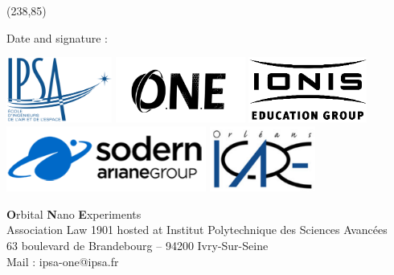 \documentclass[12pt, a4paper, openright]{report}
\begin{document}
	\framebox(238,85){\begin{minipage}[]{10cm}
			\begin{center}
				Date and signature :\\
				\vspace{1cm}
				
				
			\end{center}
			
	\end{minipage}}
\vspace{3pt}
\begin{center}
	\includegraphics[height=2.15cm]{ipsa} \qquad
	\includegraphics[height=2.15cm]{logooneblack}\qquad
	\includegraphics[height=2.15cm]{logoionis}\\
	\includegraphics[height=2.15cm]{sodern}\qquad
	\includegraphics[height=2.15cm]{icare}
\end{center}
		\begin{center}
			\footnotesize
			\textbf{O}rbital \textbf{N}ano \textbf{E}xperiments\\
			Association Law 1901 hosted at Institut Polytechnique des Sciences Avancées\\
			63 boulevard de Brandebourg – 94200 Ivry-Sur-Seine\\
			Mail : ipsa-one@ipsa.fr
		\end{center}
\end{document}
